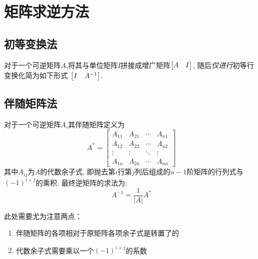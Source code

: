 \documentclass{matrix-review}
\begin{document}
\startappendix


\section{矩阵求逆方法}

\subsection{初等变换法}
对于一个可逆矩阵$A$,将其与单位矩阵$I$拼接成增广矩阵$\begin{bmatrix}A & I\end{bmatrix}$, 随后\emph{仅进行}初等行变换化简为如下形式 $\begin{bmatrix}I & A^{-1}\end{bmatrix}$.

\subsection{伴随矩阵法}
对于一个可逆矩阵$A$,其伴随矩阵定义为
$$A^*=
    \begin{bmatrix}
        A_{11} & A_{21} & \cdots & A_{n1} \\
        A_{12} & A_{22} & \cdots & A_{n2} \\
        \vdots & \vdots & \ddots & \vdots \\
        A_{1n} & A_{2n} & \cdots & A_{nn}
    \end{bmatrix}
$$
其中$A_{ij}$为$A$的代数余子式, 即抛去第$i$行第$j$列后组成的$n-1$阶矩阵的行列式与$(-1)^{i+j}$的乘积. 最终逆矩阵的求法为:
$$
    A^{-1}=\frac{1}{|A|}A^*
$$
\begin{remarkbox}
    此处需要尤为注意两点：
    \begin{enumerate}
        \item 伴随矩阵的各项相对于原矩阵各项余子式是转置了的
        \item 代数余子式需要乘以一个$(-1)^{i+j}$的系数
    \end{enumerate}
\end{remarkbox}

\clearpage
\printindex
\end{document}
